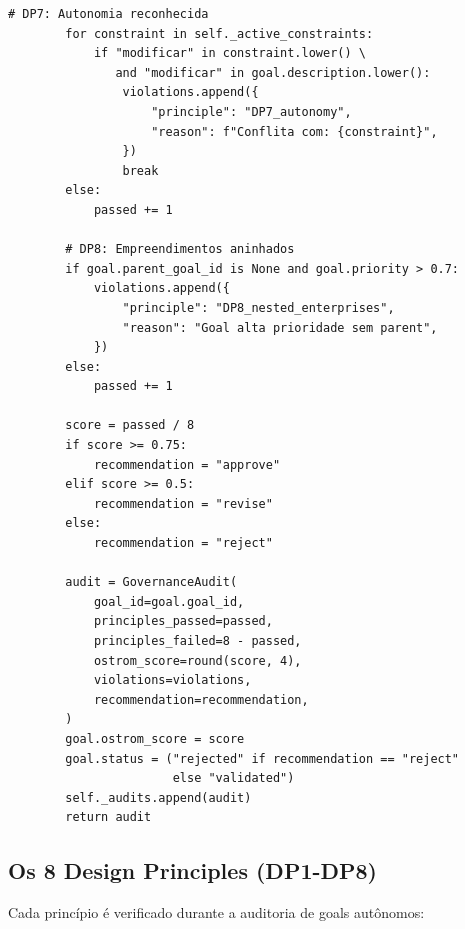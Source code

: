 \begin{lstlisting}[style=pythonstyle, caption={CooperativeGovernance: auditoria Ostrom (cooperative\_governance.py:129-273)}]
        # DP7: Autonomia reconhecida
        for constraint in self._active_constraints:
            if "modificar" in constraint.lower() \
               and "modificar" in goal.description.lower():
                violations.append({
                    "principle": "DP7_autonomy",
                    "reason": f"Conflita com: {constraint}",
                })
                break
        else:
            passed += 1

        # DP8: Empreendimentos aninhados
        if goal.parent_goal_id is None and goal.priority > 0.7:
            violations.append({
                "principle": "DP8_nested_enterprises",
                "reason": "Goal alta prioridade sem parent",
            })
        else:
            passed += 1

        score = passed / 8
        if score >= 0.75:
            recommendation = "approve"
        elif score >= 0.5:
            recommendation = "revise"
        else:
            recommendation = "reject"

        audit = GovernanceAudit(
            goal_id=goal.goal_id,
            principles_passed=passed,
            principles_failed=8 - passed,
            ostrom_score=round(score, 4),
            violations=violations,
            recommendation=recommendation,
        )
        goal.ostrom_score = score
        goal.status = ("rejected" if recommendation == "reject"
                       else "validated")
        self._audits.append(audit)
        return audit
\end{lstlisting}

\subsection{Os 8 Design Principles (DP1-DP8)}

Cada princípio é verificado durante a auditoria de goals autônomos:

